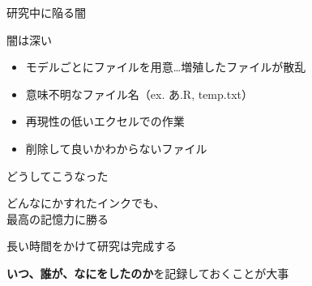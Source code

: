 \documentclass[ignorenonframetext,]{beamer}
\begin{document}
\begin{frame}{\faWarningSign 研究中に陥る闇}


\end{frame}

\begin{frame}{闇は深い}

\begin{itemize}
\itemsep1pt\parskip0pt
\item
  モデルごとにファイルを用意\ldots{}\newline 増殖したファイルが散乱
\item
  意味不明なファイル名（ex. あ.R, temp.txt）
\item
  再現性の低いエクセルでの作業
\item
  削除して良いかわからないファイル
\end{itemize}

\end{frame}

\begin{frame}


\end{frame}

\begin{frame}{どうしてこうなった}


\end{frame}

\begin{frame}{\Large{どんなにかすれたインクでも、\\最高の記憶力に勝る}}

長い時間をかけて研究は完成する

\faHandLeft \textbf{いつ、誰が、なにをしたのか}を記録しておくことが大事

\end{frame}

\begin{frame}


\end{frame}
\end{document}
